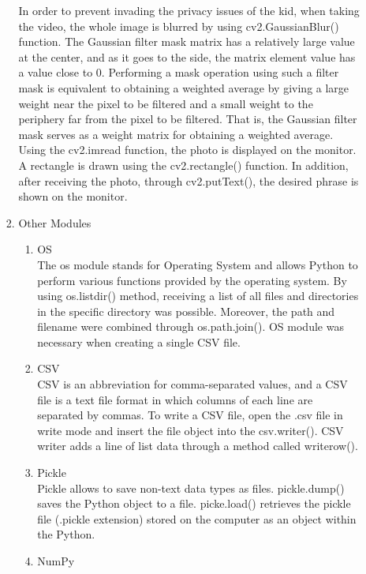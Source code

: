 \documentclass[conference]{IEEEtran}
\begin{document}
\begin{enumerate}[label=\arabic*.]
\begin{enumerate}[label=\arabic*.]
\begin{enumerate}[label=\alph*.]
        In order to prevent invading the privacy issues of the kid, when taking the video, the whole image is blurred by using cv2.GaussianBlur() function. The Gaussian filter mask matrix has a relatively large value at the center, and as it goes to the side, the matrix element value has a value close to 0. Performing a mask operation using such a filter mask is equivalent to obtaining a weighted average by giving a large weight near the pixel to be filtered and a small weight to the periphery far from the pixel to be filtered. That is, the Gaussian filter mask serves as a weight matrix for obtaining a weighted average. \\
        Using the cv2.imread function, the photo is displayed on the monitor. A rectangle is drawn using the cv2.rectangle() function. In addition, after receiving the photo, through cv2.putText(), the desired phrase is shown on the monitor. \\
        \item{\large{Other Modules}}\\ 
        \begin{enumerate}[label=\roman*.]
            \item{\large{OS}}\\ 
            The os module stands for Operating System and allows Python to perform various functions provided by the operating system. By using os.listdir() method, receiving a list of all files and directories in the specific directory was possible. Moreover, the path and filename were combined through os.path.join(). OS module was necessary when creating a single CSV file.\\
            \item{\large{CSV}}\\ 
            CSV is an abbreviation for comma-separated values, and a CSV file is a text file format in which columns of each line are separated by commas. To write a CSV file, open the .csv file in write mode and insert the file object into the csv.writer(). CSV writer adds a line of list data through a method called writerow(). \\
            \item{\large{Pickle}}\\ 
            Pickle allows to save non-text data types as files. pickle.dump() saves the Python object to a file. picke.load() retrieves the pickle file (.pickle extension) stored on the computer as an object within the Python. \\
            \item{\large{NumPy}}\\ 

\end{enumerate}
\end{enumerate}
\end{enumerate}
\end{enumerate}
\end{document}

